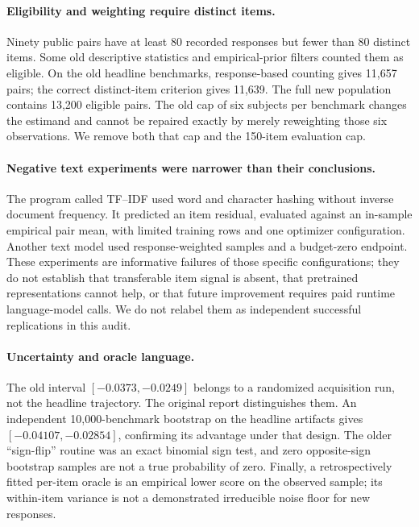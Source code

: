 \documentclass{article}
\begin{document}
\paragraph{Eligibility and weighting require distinct items.}
Ninety public pairs have at least 80 recorded responses but fewer than
80 distinct items. Some old descriptive statistics and empirical-prior filters
counted them as eligible. On the old headline benchmarks, response-based
counting gives 11,657 pairs; the correct distinct-item criterion gives
11,639. The full new population contains 13,200 eligible pairs. The old
cap of six subjects per benchmark changes the estimand and cannot be repaired
exactly by merely reweighting those six observations. We remove both that cap
and the 150-item evaluation cap.

\paragraph{Negative text experiments were narrower than their conclusions.}
The program called TF--IDF used word and character hashing without inverse
document frequency. It predicted an item residual, evaluated against an
in-sample empirical pair mean, with limited training rows and one optimizer
configuration. Another text model used response-weighted samples and a
budget-zero endpoint. These experiments are informative failures of those
specific configurations; they do not establish that transferable item signal
is absent, that pretrained representations cannot help, or that future
improvement requires paid runtime language-model calls. We do not relabel
them as independent successful replications in this audit.

\paragraph{Uncertainty and oracle language.}
The old interval $[-0.0373,-0.0249]$ belongs to a randomized acquisition run,
not the headline trajectory. The original report distinguishes them. An
independent 10,000-benchmark bootstrap on the headline artifacts gives
$[-0.04107,-0.02854]$, confirming its advantage under that design.
The older ``sign-flip'' routine was an exact binomial sign test, and zero
opposite-sign bootstrap samples are not a true probability of zero.
Finally, a retrospectively fitted per-item oracle is an empirical lower
score on the observed sample; its within-item variance is not a demonstrated
irreducible noise floor for new responses.
\end{document}
